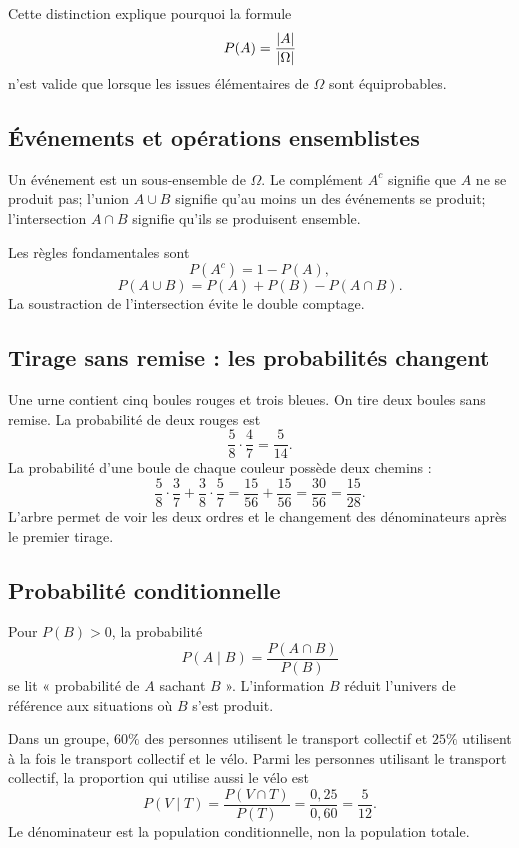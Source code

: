Cette distinction explique pourquoi la formule
\[
P(A)=\frac{\left\lvert A\right\rvert}{\left\lvert \Omega\right\rvert}
\]
n'est valide que lorsque les issues élémentaires de $\Omega$ sont équiprobables.

\subsection{Événements et opérations ensemblistes}

Un événement est un sous-ensemble de $\Omega$. Le complément $A^c$ signifie que $A$ ne se produit pas; l'union $A\cup B$ signifie qu'au moins un des événements se produit; l'intersection $A\cap B$ signifie qu'ils se produisent ensemble.

Les règles fondamentales sont
\[
P(A^c)=1-P(A),
\]
\[
P(A\cup B)=P(A)+P(B)-P(A\cap B).
\]
La soustraction de l'intersection évite le double comptage.

\subsection{Tirage sans remise : les probabilités changent}

Une urne contient cinq boules rouges et trois bleues. On tire deux boules sans remise. La probabilité de deux rouges est
\[
\frac58\cdot\frac47=\frac5{14}.
\]
La probabilité d'une boule de chaque couleur possède deux chemins :
\[
\frac58\cdot\frac37+\frac38\cdot\frac57
=\frac{15}{56}+\frac{15}{56}
=\frac{30}{56}=\frac{15}{28}.
\]
L'arbre permet de voir les deux ordres et le changement des dénominateurs après le premier tirage.

\subsection{Probabilité conditionnelle}

Pour $P(B)>0$, la probabilité
\[
P(A\mid B)=\frac{P(A\cap B)}{P(B)}
\]
se lit « probabilité de $A$ sachant $B$ ». L'information $B$ réduit l'univers de référence aux situations où $B$ s'est produit.

\begin{examplebox}
Dans un groupe, $60\%$ des personnes utilisent le transport collectif et $25\%$ utilisent à la fois le transport collectif et le vélo. Parmi les personnes utilisant le transport collectif, la proportion qui utilise aussi le vélo est
\[
P(V\mid T)=\frac{P(V\cap T)}{P(T)}=\frac{0{,}25}{0{,}60}=\frac5{12}.
\]
Le dénominateur est la population conditionnelle, non la population totale.
\end{examplebox}

